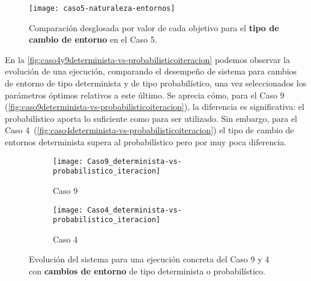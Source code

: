\begin{figure}
	\centering
	\texttt{[image: caso5-naturaleza-entornos]}
	\caption[Comparación desglosada por valor de cada objetivo para el tipo de cambio de entorno en el Caso 5]{Comparación desglosada por valor de cada objetivo para el \textbf{tipo de cambio de entorno} en el Caso 5.}
	\label{fig:caso5-naturaleza-entornos}
\end{figure}

En la \autoref{fig:caso4y9determinista-vs-probabilisticoiteracion} podemos observar la evolución de una ejecución, comparando el desempeño de sistema para cambios de entorno de tipo determinista y de tipo probabilístico, una vez seleccionados los parámetros óptimos relativos a este último. Se aprecia cómo, para el Caso 9  (\autoref{fig:caso9determinista-vs-probabilisticoiteracion}), la diferencia es significativa: el probabilístico aporta lo suficiente como para ser utilizado. Sin embargo, para el Caso 4~(\autoref{fig:caso4determinista-vs-probabilisticoiteracion}) el tipo de cambio de entornos determinista supera al probabilístico pero por muy poca diferencia.

\begin{figure}
	\begin{subfigure}{\linewidth}
		\centering
		\texttt{[image: Caso9\_determinista-vs-probabilistico\_iteracion]}
		\caption{Caso 9}
		\label{fig:caso9determinista-vs-probabilisticoiteracion}
	\end{subfigure}

	\begin{subfigure}{\linewidth}
		\centering
		\texttt{[image: Caso4\_determinista-vs-probabilistico\_iteracion]}
		\caption{Caso 4}
		\label{fig:caso4determinista-vs-probabilisticoiteracion}
	\end{subfigure}
	\caption[Evolución del sistema para una ejecución concreta del Caso 9 y 4 con cambios de entorno de tipo determinista o probabilístico]{Evolución del sistema para una ejecución concreta del Caso 9 y 4 con \textbf{cambios de entorno} de tipo determinista o probabilístico.}
	\label{fig:caso4y9determinista-vs-probabilisticoiteracion}
\end{figure}



